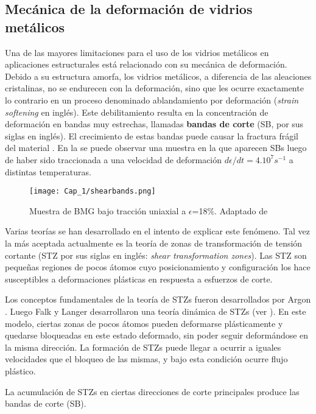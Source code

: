 \subsection{Mecánica de la deformación de vidrios metálicos}
\label{S1_1_3}

Una de las mayores limitaciones para el uso de los vidrios metálicos en aplicaciones estructurales está relacionado con su mecánica de deformación. Debido a su estructura amorfa, los vidrios metálicos, a diferencia de las aleaciones cristalinas, no se endurecen con la deformación, sino que les ocurre exactamente lo contrario en un proceso denominado ablandamiento por deformación (\textit{strain softening} en inglés). Este debilitamiento resulta en la concentración de deformación en bandas muy estrechas, llamadas \textbf{bandas de corte} (SB, por sus siglas en inglés). El crecimiento de estas bandas puede causar la fractura frágil del material \citep{schuh07}. En la  se puede observar una muestra en la que aparecen SBs luego de haber sido traccionada a una velocidad de deformación $d\epsilon/dt=4.10^7s^{-1}$ a distintas temperaturas.

\begin{figure}[H]
 \centering
 \texttt{[image: Cap\_1/shearbands.png]}
 \caption[Bandas de corte]{Muestra de BMG bajo tracción uniaxial a $\epsilon$=18\%. Adaptado de \cite{albe13}}
 \label{C1:fg:shearbands}
\end{figure}

Varias teorías se han desarrollado en el intento de explicar este fenómeno. Tal vez la más aceptada actualmente es la teoría de zonas de transformación de tensión cortante (STZ por sus siglas en inglés: \textit{shear transformation zones}). Las STZ son pequeñas regiones de pocos átomos cuyo posicionamiento y configuración los hace susceptibles a deformaciones plásticas en respuesta a esfuerzos de corte.

Los conceptos fundamentales de la teoría de STZs fueron desarrollados por Argon \citep{argon79}. Luego Falk y Langer \citep{Falk98, Langer07} desarrollaron una teoría dinámica de STZs (ver ). En este modelo, ciertas zonas de pocos átomos pueden deformarse plásticamente y quedarse bloqueadas en este estado deformado, sin poder seguir deformándose en la misma dirección. La formación de STZs puede llegar a ocurrir a iguales velocidades que el bloqueo de las mismas, y bajo esta condición ocurre flujo plástico.

La acumulación de STZs en ciertas direcciones de corte principales produce las bandas de corte (SB).

